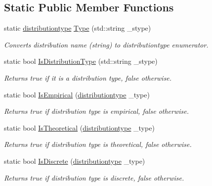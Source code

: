 \subsection*{Static Public Member Functions}
\begin{DoxyCompactItemize}
\item 
static \hyperlink{class_c_random_variable_a80d2a87c43847274138b51f7d713d7f1}{distributiontype} \hyperlink{class_c_random_variable_a87739ee9917b55b192f8b1e4777b0916}{Type} (std\-::string \-\_\-stype)
\begin{DoxyCompactList}\small\item\em Converts distribution name (string) to distributiontype enumerator. \end{DoxyCompactList}\item 
static bool \hyperlink{class_c_random_variable_a7d0cbf19632ca243dbf96881502b28c0}{Is\-Distribution\-Type} (std\-::string \-\_\-stype)
\begin{DoxyCompactList}\small\item\em Returns true if it is a distribution type, false otherwise. \end{DoxyCompactList}\item 
static bool \hyperlink{class_c_random_variable_a191362146e99faf481a337726690683c}{Is\-Empirical} (\hyperlink{class_c_random_variable_a80d2a87c43847274138b51f7d713d7f1}{distributiontype} \-\_\-type)
\begin{DoxyCompactList}\small\item\em Returns true if distribution type is empirical, false otherwise. \end{DoxyCompactList}\item 
static bool \hyperlink{class_c_random_variable_a0ecaf5ec46a8bc088209f83020f62eb2}{Is\-Theoretical} (\hyperlink{class_c_random_variable_a80d2a87c43847274138b51f7d713d7f1}{distributiontype} \-\_\-type)
\begin{DoxyCompactList}\small\item\em Returns true if distribution type is theoretical, false otherwise. \end{DoxyCompactList}\item 
static bool \hyperlink{class_c_random_variable_ae0a7a7eb479ffc62db0fb338474362b4}{Is\-Discrete} (\hyperlink{class_c_random_variable_a80d2a87c43847274138b51f7d713d7f1}{distributiontype} \-\_\-type)
\begin{DoxyCompactList}\small\item\em Returns true if distribution type is discrete, false otherwise. \end{DoxyCompactList}\item 

\end{DoxyCompactItemize}
